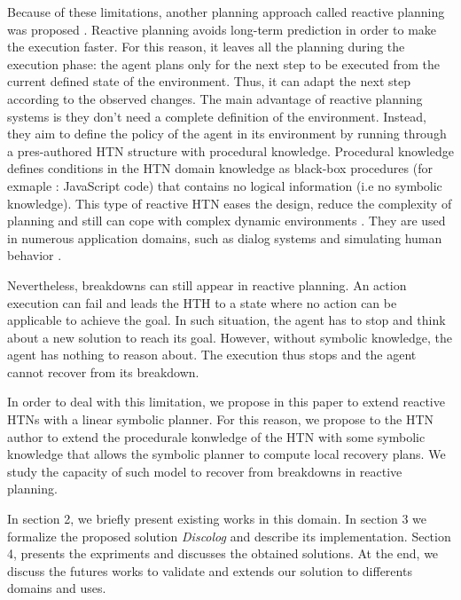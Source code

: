 \documentclass[conference]{IEEEtran}
\begin{document}
	\par Because of these limitations, another planning approach called reactive planning was proposed \cite{firby1987investigation}. Reactive planning avoids long-term prediction in order to make the execution faster. For this reason, it leaves all the planning during the execution phase: the agent plans only for the next step to be executed from the current defined state of the environment. Thus, it can adapt the next step according to the observed changes. The main advantage of reactive planning systems is they don't need a complete definition of the environment. Instead, they aim to define the policy of the agent in its environment by running through a pres-authored HTN structure with  procedural  knowledge. Procedural knowledge defines conditions in the HTN domain knowledge as black-box procedures (for exmaple : JavaScript code) that contains no logical information (i.e no symbolic knowledge). This type of reactive HTN  eases the design, reduce the complexity of planning and still can cope with complex dynamic environments \cite {brom2005hierarchical}. They are used in numerous application domains, such as dialog systems \cite{bohus2003ravenclaw} and simulating human behavior \cite{brom2005hierarchical}.
	\par Nevertheless, breakdowns can still appear in reactive planning. An action execution can fail and leads the HTH to a state where no action can be applicable to achieve the goal. 
	In such situation, the agent has to stop and think about a new solution to reach its goal. However, without symbolic knowledge, the agent has nothing to reason about. The execution thus stops and the agent cannot recover from its breakdown.
	
	\par  In order to deal with this limitation, we propose in this paper to extend reactive HTNs with a linear symbolic planner. For this reason, we propose to  the HTN author to extend the procedurale konwledge of the HTN with some symbolic knowledge that allows the symbolic planner to  compute local recovery plans. We study the capacity of such  model to recover from breakdowns in reactive planning. 
	
	\par In section 2, we briefly present existing works in this domain. In section 3 we formalize the proposed solution \textit{Discolog} and describe its implementation. Section 4, presents the expriments and discusses the obtained solutions. At the end, we discuss the futures works to validate and extends our solution to differents domains and uses.
	
\end{document}
